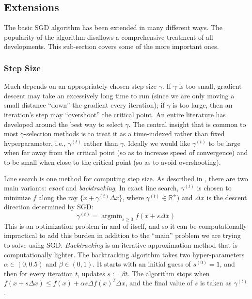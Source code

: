 \documentclass{article}
\DeclareMathOperator*{\argmin}{argmin}
\begin{document}
\subsection{Extensions}

The basic SGD algorithm has been extended in many different ways. The popularity of
the algorithm disallows a comprehensive treatment of all
developments. This sub-section covers some of the more important
ones.


\subsubsection{Step Size}

Much depends on
an appropriately chosen step size $\gamma$. If $\gamma$ is too small, gradient
descent may
take an excessively long time to run (since we are only moving a small distance
``down'' the gradient every iteration); if $\gamma$ is too large, then an
iteration's step may ``overshoot'' the critical point.
An entire literature has developed around the best way to select $\gamma$. The
central insight that is common to most $\gamma$-selection methods is to treat it
as a time-indexed rather than fixed hyperparameter, i.e., $\gamma^{(t)}$ rather
than $\gamma$. Ideally we would like $\gamma^{(t)}$ to be large when far away
from the critical point (so as to increase speed of convergence) and to be small
when close to the critical point (so as to avoid overshooting).

Line search is one method for computing step size. As described in
\cite{boyd2004convex}, there are two main variants: \textit{exact} and
\textit{backtracking}. In exact line search, $\gamma^{(t)}$ is chosen to minimize $f$
along the ray $\{x + \gamma^{(t)} \Delta x\}$, where $\gamma^{(t)} \in \mathbb{R}^+)$ and
$\Delta x$ is the descent direction determined by SGD:
\begin{equation}
	\gamma^{(t)} = \argmin_{s \geq 0} f(x + s\Delta x)
\end{equation}
This is an optimization problem in and of itself, and
so it can be computationally impractical to add this burden in addition to the
``main'' problem we are trying to solve using SGD. \textit{Backtracking} is an iterative approximation method that is
computationally lighter. The backtracking algorithm takes two hyper-parameters
$\alpha \in (0, 0.5)$ and $\beta \in (0, 1)$. It starts with an initial guess of
$s^{(0)} = 1$, and then for every iteration $t$, updates $s := \beta t$. The
algorithm stops when $f(x + s \Delta x) \leq f(x) + \alpha s \Delta f(x)^T
\Delta x$, and the final value of $s$ is taken as $\gamma^{(t)}$. 
\end{document}
